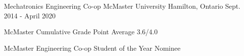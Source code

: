 
\begin{cventries}

  \cventry
    {Mechatronics Engineering Co-op} %
    {McMaster University} %
    {Hamilton, Ontario} %
    {Sept. 2014 - April 2020} %
    {
      \begin{cvitems} %
        \item {McMaster Cumulative Grade Point Average 3.6/4.0}
        \item {McMaster Engineering Co-op Student of the Year Nominee}
      \end{cvitems}
    }


\end{cventries}
